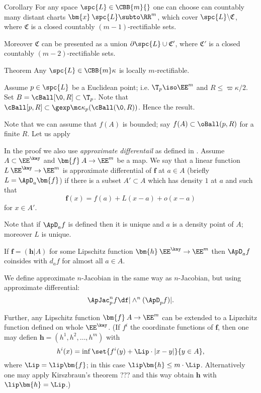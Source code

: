 \begin{thm}{Corollary}
For any space $\spc{L}\in\CBB{m}{}$ 
one can choose can countably many distant charts $\bm{x}\:\spc{L}\subto\RR^m$, which cover $\spc{L}\backslash\mathfrak{C}$,
where $\mathfrak{C}$ is a closed countably $(m-1)$-rectifiable sets.

Moreover $\mathfrak{C}$ can be presented as a union $\partial\spc{L}\cup\mathfrak{C}'$,
where $\mathfrak{C}'$ is a closed countably $(m-2)$-rectifiable sets.
\end{thm}










\begin{thm}{Theorem}
Any $\spc{L}\in\CBB{m}\kappa$ is locally $m$-rectifiable.
\end{thm}

Assume $p\in\spc{L}$ be a Euclidean point; i.e. $\T_p\iso\EE^m$ and $R\le\varpi\kappa/2$.
Set $B=\cBall[\0,R]\subset\T_p$.
Note that $\cBall[p,R]\subset\gexp\mc\kappa_p(\cBall(\0,R))$.
Hence the result.
\qeds








Note that we can assume that $f(A)$ is bounded;
say $f(A)\subset \oBall(p,R)$ for a finite $R$.
Let us apply 

In the proof we also use 
\emph{approximate differentail}%
as defined in \cite[3.1.2]{federer}.
Assume $A\subset\EE^\kay$ and $\bm{f}\: A\to \EE^m$ be a map.
We say that a linear function $L\:\EE^\kay\to\EE^m$ is approximate differential of $\bm{f}$ at $a\in A$
(briefly $L=\ApD_a\bm{f}$)
if there is a subset $A'\subset A$ which has density $1$ at $a$ and such that
$$\bm{f}(x)=f(a)+L(x-a)+o(x-a)$$
for $x\in A'$.


Note that if $\ApD_af$ is defined then
it is unique 
and  $a$ is a density point of $A$; 
moreover $L$ is unique.


If $\bm{f}=(\bm{h}|A)$ for some Lipschitz function 
$\bm{h}\:\EE^\kay\to\EE^m$ then 
$\ApD_af$ coinsides with $d_af$ for almost all $a\in A$.

We define approximate $n$-Jacobian
in the same way as $n$-Jacobian, but using approximate differential:
$$\ApJac^n_p f\df
|\wedge^n(\ApD_pf)|.$$ 

Further, any Lipschitz function $\bm{f}\:A\to \EE^m$
can be extended to a Lipzchitz function defined on whole $\EE^\kay$.
(If $f^i$ the coordinate functions of $\bm{f}$,
then one may defien $\bm{h}=(h^1,h^2,\dots,h^m)$
with
$$h^i(x)=\inf\set{f^i(y)+\Lip\cdot|x-y|}{y\in A},$$
where $\Lip=\lip \bm{f}$;
in this case $\lip \bm{h}\le m\cdot \Lip$.
Alternatively one may apply Kirszbraun's theorem ??? and this way obtain $\bm{h}$ 
with $\lip \bm{h}= \Lip$.)

